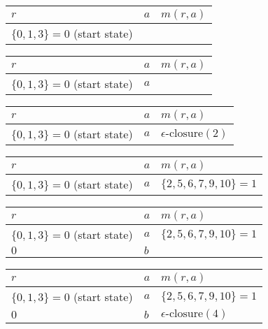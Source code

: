 \documentclass[8pt,a4paper,compress]{beamer}
\begin{document}
\begin{frame}[fragile]
\begin{overprint}
\begin{center}
\begin{tabular}{|C{4cm}|C{.5cm}|C{4cm}|} \hline
$r$ & $a$ & $m(r, a)$ \\ \hline \hline
$\{0, 1, 3\} = 0$ (start state) & & \\ \hline
\end{tabular}
\end{center}

\begin{center}
\begin{tabular}{|C{4cm}|C{.5cm}|C{4cm}|} \hline
$r$ & $a$ & $m(r, a)$ \\ \hline \hline
$\{0, 1, 3\} = 0$ (start state) & $a$ & \\ \hline
\end{tabular}
\end{center}

\begin{center}
\begin{tabular}{|C{4cm}|C{.5cm}|C{4cm}|} \hline
$r$ & $a$ & $m(r, a)$ \\ \hline \hline
$\{0, 1, 3\} = 0$ (start state) & $a$ &  $\epsilon\text{-closure}(2)$ \\ \hline
\end{tabular}
\end{center}

\begin{center}
\begin{tabular}{|C{4cm}|C{.5cm}|C{4cm}|} \hline
$r$ & $a$ & $m(r, a)$ \\ \hline \hline
$\{0, 1, 3\} = 0$ (start state) & $a$ &  $\{2, 5, 6, 7, 9, 10\} = 1$ \\ \hline
\end{tabular}
\end{center}

\begin{center}
\begin{tabular}{|C{4cm}|C{.5cm}|C{4cm}|} \hline
$r$ & $a$ & $m(r, a)$ \\ \hline \hline
$\{0, 1, 3\} = 0$ (start state) & $a$ &  $\{2, 5, 6, 7, 9, 10\} = 1$ \\ \hline
$0$ & $b$ &   \\ \hline
\end{tabular}
\end{center}

\begin{center}
\begin{tabular}{|C{4cm}|C{.5cm}|C{4cm}|} \hline
$r$ & $a$ & $m(r, a)$ \\ \hline \hline
$\{0, 1, 3\} = 0$ (start state) & $a$ &  $\{2, 5, 6, 7, 9, 10\} = 1$ \\ \hline
$0$ & $b$ & $\epsilon\text{-closure}(4)$  \\ \hline
\end{tabular}
\end{center}


\end{overprint}
\end{frame}
\end{document}

